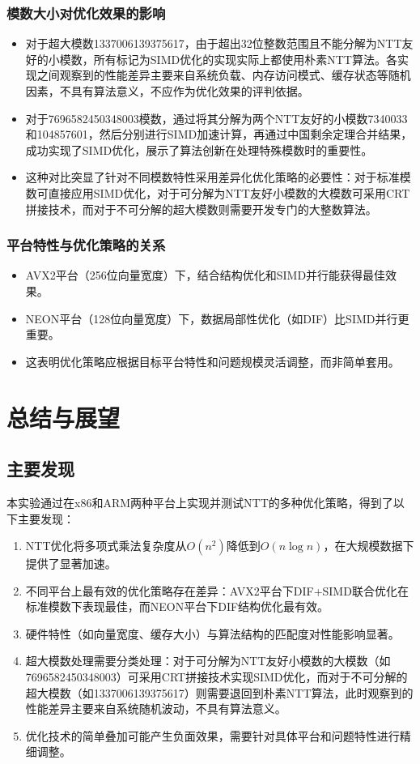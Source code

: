 \documentclass[a4paper,colorlinks=true,linkcolor=blue,urlcolor=blue,citecolor=green,bookmarks=true]{article}
\begin{document}
\subsubsection{模数大小对优化效果的影响}
\begin{itemize}
  \item 对于超大模数1337006139375617，由于超出32位整数范围且不能分解为NTT友好的小模数，所有标记为SIMD优化的实现实际上都使用朴素NTT算法。各实现之间观察到的性能差异主要来自系统负载、内存访问模式、缓存状态等随机因素，不具有算法意义，不应作为优化效果的评判依据。
  \item 对于7696582450348003模数，通过将其分解为两个NTT友好的小模数7340033和104857601，然后分别进行SIMD加速计算，再通过中国剩余定理合并结果，成功实现了SIMD优化，展示了算法创新在处理特殊模数时的重要性。
  \item 这种对比突显了针对不同模数特性采用差异化优化策略的必要性：对于标准模数可直接应用SIMD优化，对于可分解为NTT友好小模数的大模数可采用CRT拼接技术，而对于不可分解的超大模数则需要开发专门的大整数算法。
\end{itemize}

\subsubsection{平台特性与优化策略的关系}
\begin{itemize}
  \item AVX2平台（256位向量宽度）下，结合结构优化和SIMD并行能获得最佳效果。
  \item NEON平台（128位向量宽度）下，数据局部性优化（如DIF）比SIMD并行更重要。
  \item 这表明优化策略应根据目标平台特性和问题规模灵活调整，而非简单套用。
\end{itemize}

\section{总结与展望}

\subsection{主要发现}
本实验通过在x86和ARM两种平台上实现并测试NTT的多种优化策略，得到了以下主要发现：

\begin{enumerate}
  \item NTT优化将多项式乘法复杂度从$O(n^2)$降低到$O(n\log n)$，在大规模数据下提供了显著加速。
  \item 不同平台上最有效的优化策略存在差异：AVX2平台下DIF+SIMD联合优化在标准模数下表现最佳，而NEON平台下DIF结构优化最有效。
  \item 硬件特性（如向量宽度、缓存大小）与算法结构的匹配度对性能影响显著。
  \item 超大模数处理需要分类处理：对于可分解为NTT友好小模数的大模数（如7696582450348003）可采用CRT拼接技术实现SIMD优化，而对于不可分解的超大模数（如1337006139375617）则需要退回到朴素NTT算法，此时观察到的性能差异主要来自系统随机波动，不具有算法意义。
  \item 优化技术的简单叠加可能产生负面效果，需要针对具体平台和问题特性进行精细调整。
\end{enumerate}
\end{document}
